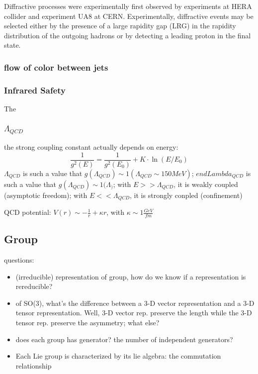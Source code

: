 Diffractive processes were experimentally first observed by experiments at HERA
collider and experiment UA8 at CERN. Experimentally, diffractive events may be 
selected either by the presence of a large rapidity gap (LRG) in the rapidity 
distribution of the outgoing hadrons or by detecting a leading proton in the 
final state.

\subsubsection{flow of color between jets}

\subsubsection{Infrared Safety}
The 

\subsubsection{$\Lambda_{QCD}$}
the strong coupling constant actually depends on energy:
$$ \frac{1}{g^2(E)} = \frac{1}{g^2(E_0)} + K\cdot \ln(E/E_0) $$
$\Lambda_{QCD}$ is such a value that $g(\Lambda_{QCD}) \sim 1 (\Lambda_{QCD} \sim 150 MeV)$; 
$endLambda_{QCD}$ is such a value that $g(\Lambda_{QCD}) \sim 1 (\Lambda_)$; 
with $E >> \Lambda_{QCD}$, it is weakly coupled (asymptotic freedom);
with $E << \Lambda_{QCD}$, it is strongly conpled (confinement)

QCD potential: $V(r) \sim -\frac{1}{r} + \kappa r$, with $\kappa \sim 1 \frac{GeV}{fm}$


\subsection{Group}
questions:
\begin{itemize}
    \item (irreducible) representation of group, how do we know if a 
	representation is rereducible?
    \item of SO(3), what's the difference between a 3-D vector representation 
	and a 3-D tensor representation. Well, 3-D vector rep. preserve the
	length while the 3-D tensor rep. preserve the asymmetry; what else?
    \item does each group has generator? the number of independent generators?
    \item Each Lie group is characterized by its lie algebra: the commutation relationship
\end{itemize}

